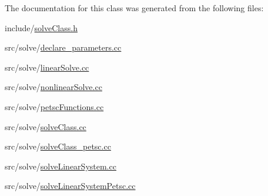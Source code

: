 The documentation for this class was generated from the following files\-:\begin{DoxyCompactItemize}
\item 
include/\hyperlink{solve_class_8h}{solve\-Class.\-h}\item 
src/solve/\hyperlink{solve_2declare__parameters_8cc}{declare\-\_\-parameters.\-cc}\item 
src/solve/\hyperlink{linear_solve_8cc}{linear\-Solve.\-cc}\item 
src/solve/\hyperlink{nonlinear_solve_8cc}{nonlinear\-Solve.\-cc}\item 
src/solve/\hyperlink{petsc_functions_8cc}{petsc\-Functions.\-cc}\item 
src/solve/\hyperlink{solve_class_8cc}{solve\-Class.\-cc}\item 
src/solve/\hyperlink{solve_class__petsc_8cc}{solve\-Class\-\_\-petsc.\-cc}\item 
src/solve/\hyperlink{solve_linear_system_8cc}{solve\-Linear\-System.\-cc}\item 
src/solve/\hyperlink{solve_linear_system_petsc_8cc}{solve\-Linear\-System\-Petsc.\-cc}\end{DoxyCompactItemize}
